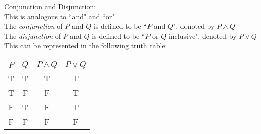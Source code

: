 Conjunction and Disjunction:\\
This is analogous to ``and" and ``or".\\
The \textit{conjunction} of $P$ and $Q$ is defined to be ``$P$ and $Q$", denoted by $P\wedge Q$\\
The \textit{disjunction} of $P$ and $Q$ is defined to be ``$P$ or $Q$ inclusive", denoted by $P\vee Q$\\
This can be represented in the following truth table:\\
\begin{tabular}{c|c|c|c}
    $P$ & $Q$ & $P\wedge Q$ & $P\vee Q$\\
    \hline
    T & T & T & T\\
    T & F & F & T\\
    F & T & F & T\\
    F & F & F & F
\end{tabular}\\

